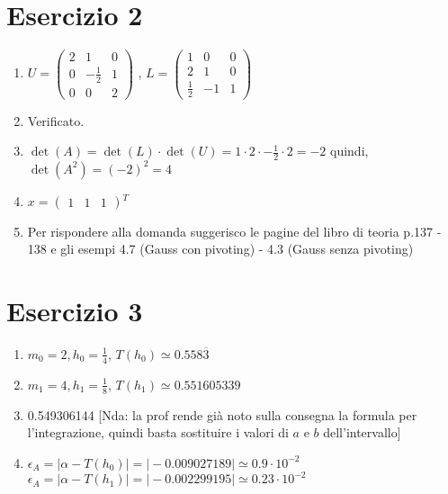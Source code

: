 \documentclass[12pt]{article}
\begin{document}
    \section{Esercizio 2}
    \begin{enumerate}
        \item 
            \( U = \begin{pmatrix}
                2 & 1 & 0 \\
                0 & -\frac{1}{2} & 1 \\
                0 & 0 & 2
                \end{pmatrix}
            \) , 
            \( L = \begin{pmatrix}
                1 & 0 & 0 \\
                2 & 1 & 0 \\
                \frac{1}{2} & -1 & 1
                \end{pmatrix}
            \)
        \item Verificato.
        \item $\det(A) = \det(L) \cdot \det(U) = 1 \cdot 2 \cdot -\frac{1}{2} \cdot 2 = -2$ quindi, $\det(A^2) = (-2)^2 = 4$
        \item \( x = \begin{pmatrix}
            1 & 1 & 1
            \end{pmatrix}
        \)$^T$
        \item Per rispondere alla domanda suggerisco le pagine del libro di teoria p.137 - 138 e gli esempi 4.7 (Gauss con pivoting) - 4.3 (Gauss senza pivoting) 
    \end{enumerate}

    \section{Esercizio 3}
    \begin{enumerate}
        \item $m_0 = 2, h_0 = \frac{1}{4}$, $T(h_0) \simeq 0.558\overline{3}$
        \item $m_1 = 4, h_1 = \frac{1}{8}$, $T(h_1) \simeq 0.551605339$
        \item 0.549306144 [Nda: la prof rende già noto sulla consegna la formula per l'integrazione, quindi basta sostituire i valori di $a$ e $b$ dell'intervallo]
        \item $\epsilon _A = \vert \alpha - T(h_0) \vert = \vert -0.009027189 \vert \simeq 0.9 \cdot 10^{-2}$ \newline
         $\epsilon _A = \vert \alpha - T(h_1) \vert = \vert -0.002299195 \vert \simeq 0.23 \cdot 10^{-2}$
    \end{enumerate}
\end{document}
